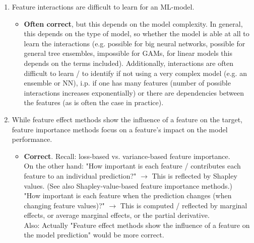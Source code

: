 \begin{enumerate}
    	\item %
        Feature interactions are difficult to learn for an ML-model.
    	\begin{itemize}
    		\item[$\Rightarrow$] \textbf{Often correct}, but this depends on the model complexity. In general, this depends on the type of model, so whether the model is able at all to learn the interactions (e.g. possible for big neural networks, possible for general tree ensembles, impossible for GAMs, for linear models this depends on the terms included). Additionally, interactions are often difficult to learn / to identify if not using a very complex model (e.g. an ensemble or NN), i.p. if one has many features (number of possible interactions increases exponentially) or there are dependencies between the features (as is often the case in practice).
    	\end{itemize}


    	\item While feature effect methods show the influence of a feature on the target, feature importance methods focus on a feature's impact on the model performance.
    	\begin{itemize}
    		\item[$\Rightarrow$] \textbf{Correct}. Recall: loss-based vs. variance-based feature importance. \\
            On the other hand: "How important is each feature / contributes each feature to an individual prediction?" \(\rightarrow\) This is reflected by Shapley values. (See also Shapley-value-based feature importance methods.) \\
            "How important is each feature when the prediction changes (when changing feature values)?" \(\rightarrow\) This is computed / reflected by marginal effects, or average marginal effects, or the partial derivative. \\
            Also: Actually "Feature effect methods show the influence of a feature on the model prediction" would be more correct.
    	\end{itemize}


\end{enumerate}
